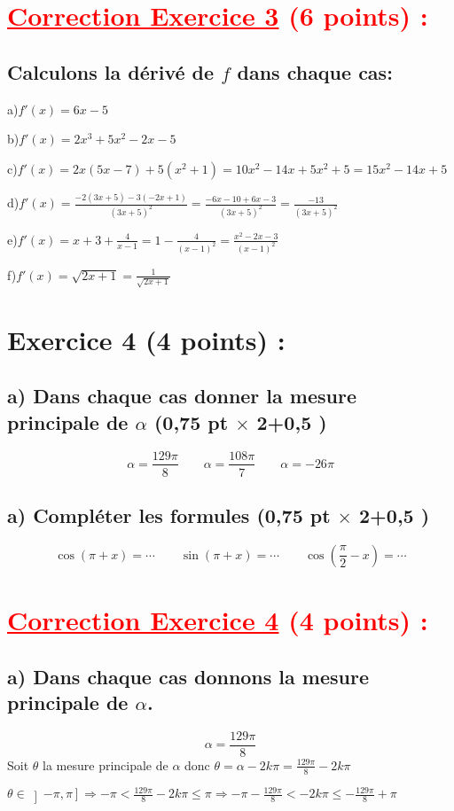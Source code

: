\documentclass[12pt]{article}
\begin{document}
\section*{\textcolor{red}{\underline{Correction Exercice 3} (6 points) :}}
\subsection*{ Calculons la dérivé de $f$ dans chaque cas:}
a)$f'(x)=6x-5$

b)$f'(x)=2x^{3}+5x^{2}-2x-5$ 

c)$f'(x)=2x(5x-7)+5(x^{2}+1)=10x^{2}-14x+5x^{2}+5=15x^{2}-14x+5$

d)$f'(x)=\frac{-2(3x+5)-3(-2x+1)}{(3x+5)^{2}}=\frac{-6x-10+6x-3}{(3x+5)^{2}}=\frac{-13}{(3x+5)^{2}}$

e)$f'(x)=x+3+\frac{4}{x-1}=1-\frac{4}{(x-1)^{2}}=\frac{x^{2}-2x-3}{(x-1)^{2}}$

f)$f'(x)=\sqrt{2x+1}=\frac{1}{\sqrt{2x+1}}$
\section*{Exercice 4 (4 points) :}
\subsection*{a) Dans chaque cas donner la mesure principale de $\alpha$ (0,75 pt $\times$ 2+0,5 )}
\[\alpha =\frac{129\pi}{8}\quad\quad \alpha =\frac{108\pi}{7}\quad\quad \alpha = -26\pi \]
\subsection*{a) Compléter les formules (0,75 pt $\times$ 2+0,5 )}
\[\cos(\pi+x)=\cdots\quad\quad \sin(\pi+x)=\cdots\quad\quad \cos(\frac{\pi}{2}-x)=\cdots\]
\section*{\textcolor{red}{\underline{Correction Exercice 4} (4 points) :}}
\subsection*{a) Dans chaque cas donnons la mesure principale de $\alpha$.}
\[\alpha =\frac{129\pi}{8} \]
Soit $\theta$ la mesure principale de $\alpha$ donc $\theta=\alpha-2k\pi=\frac{129\pi}{8}-2k\pi$ 

$\theta \in \left]-\pi, \pi\right]\Rightarrow -\pi<\frac{129\pi}{8}-2k\pi\leq \pi \Rightarrow -\pi-\frac{129\pi}{8}<-2k\pi\leq-\frac{129\pi}{8}+\pi$ 
\end{document}
